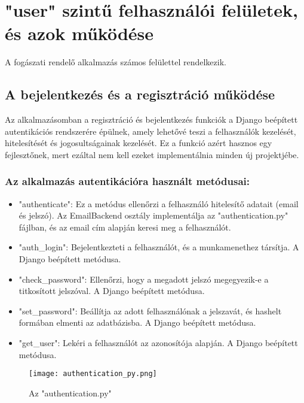 \chapter{"user" szintű felhasználói felületek, és azok működése}
\label{chap:fejezet5}

A fogászati rendelő alkalmazás számos felülettel rendelkezik.

\section{A bejelentkezés és a regisztráció működése}

Az alkalmazásomban a regisztráció és bejelentkezés funkciók a Django beépített autentikációs rendszerére épülnek, amely lehetővé teszi a felhasználók kezelését, hitelesítését és jogosultságainak kezelését. Ez a funkció azért hasznos egy fejlesztőnek, mert ezáltal nem kell ezeket implementálnia minden új projektjébe.

\subsection{Az alkalmazás autentikációra használt metódusai:}

\begin{itemize}
	\item "authenticate": Ez a metódus ellenőrzi a felhasználó hitelesítő adatait (email és jelszó). Az EmailBackend osztály implementálja az "authentication.py" fájlban, és az email cím alapján keresi meg a felhasználót.
	\item "auth\_login": Bejelentkezteti a felhasználót, és a munkamenethez társítja. A Django beépített metódusa.
	\item "check\_password": Ellenőrzi, hogy a megadott jelszó megegyezik-e a titkosított jelszóval. A Django beépített metódusa.
	\item "set\_password": Beállítja az adott felhasználónak a jelszavát, és hashelt formában elmenti az adatbázisba. A Django beépített metódusa.
	\item "get\_user": Lekéri a felhasználót az azonosítója alapján. A Django beépített metódusa.
\end{itemize}

\begin{figure}[!htbp]
	\caption{Az "authentication.py"}
	\label{fig:authentication}
	\centering
	\texttt{[image: authentication\_py.png]}
\end{figure}

